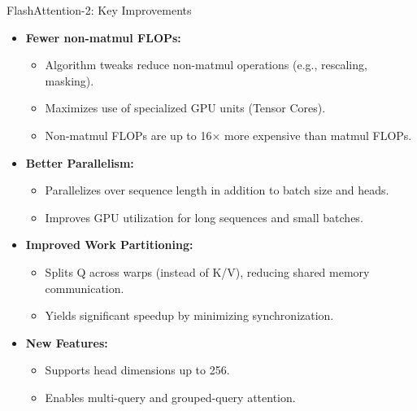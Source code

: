\begin{frame}[allowframebreaks]{FlashAttention-2: Key Improvements}
    \begin{itemize}
        \item \textbf{Fewer non-matmul FLOPs:}
        \begin{itemize}
            \item Algorithm tweaks reduce non-matmul operations (e.g., rescaling, masking).
            \item Maximizes use of specialized GPU units (Tensor Cores).
            \item Non-matmul FLOPs are up to 16$\times$ more expensive than matmul FLOPs.
        \end{itemize}
        \item \textbf{Better Parallelism:}
        \begin{itemize}
            \item Parallelizes over sequence length in addition to batch size and heads.
            \item Improves GPU utilization for long sequences and small batches.
        \end{itemize}
    \framebreak
        \item \textbf{Improved Work Partitioning:}
        \begin{itemize}
            \item Splits Q across warps (instead of K/V), reducing shared memory communication.
            \item Yields significant speedup by minimizing synchronization.
        \end{itemize}
        \item \textbf{New Features:}
        \begin{itemize}
            \item Supports head dimensions up to 256.
            \item Enables multi-query and grouped-query attention.
        \end{itemize}
    \end{itemize}
\end{frame}

